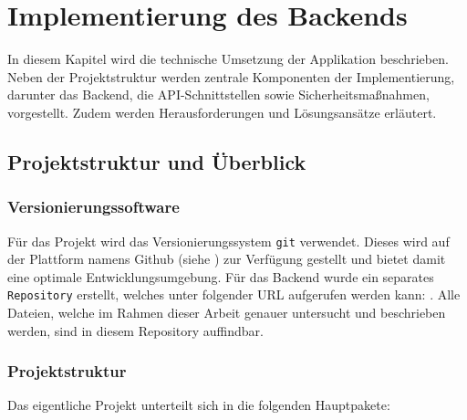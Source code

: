 \section{Implementierung des Backends}

In diesem Kapitel wird die technische Umsetzung der Applikation beschrieben. Neben der Projektstruktur werden zentrale Komponenten der Implementierung, darunter das Backend, die API-Schnittstellen sowie Sicherheitsmaßnahmen, vorgestellt. Zudem werden Herausforderungen und Lösungsansätze erläutert.

\subsection{Projektstruktur und Überblick}

\subsubsection{Versionierungssoftware}

Für das Projekt wird das Versionierungssystem \texttt{git} verwendet. Dieses wird auf der Plattform namens Github (siehe \cite{website-github}) zur Verfügung gestellt und bietet damit eine optimale Entwicklungsumgebung. Für das Backend wurde ein separates \texttt{Repository} erstellt, welches unter folgender URL aufgerufen werden kann: \cite{website-git-backend-repo}. Alle Dateien, welche im Rahmen dieser Arbeit genauer untersucht und beschrieben werden, sind in diesem Repository auffindbar.

\subsubsection{Projektstruktur}

Das eigentliche Projekt unterteilt sich in die folgenden Hauptpakete:

